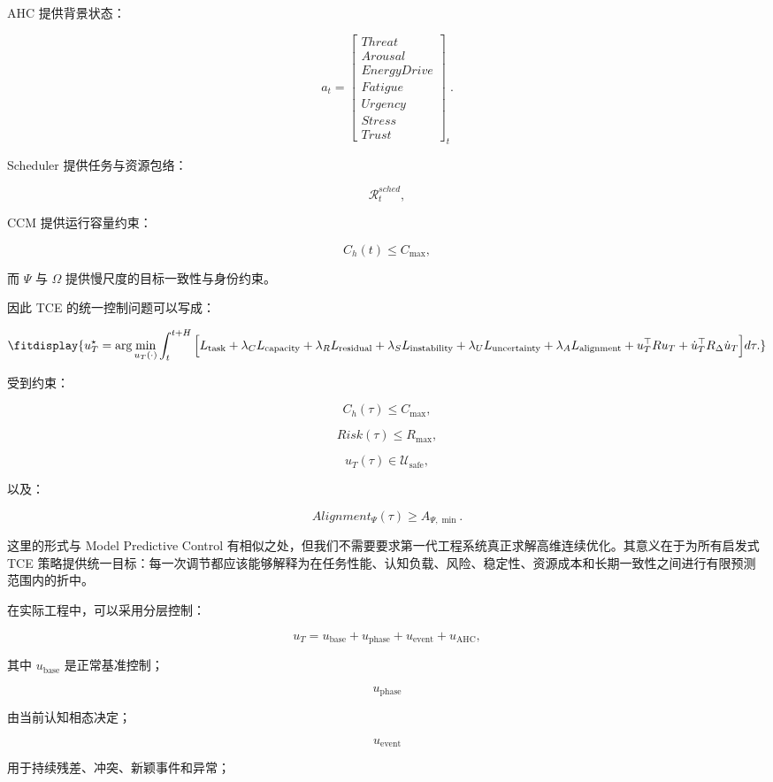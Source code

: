 AHC 提供背景状态：

\[
a_t
=
\begin{bmatrix}
Threat\\
Arousal\\
EnergyDrive\\
Fatigue\\
Urgency\\
Stress\\
Trust
\end{bmatrix}_t.
\]

Scheduler 提供任务与资源包络：

\[
\mathcal R_t^{sched},
\]

CCM 提供运行容量约束：

\[
C_h(t)\le C_{\max},
\]

而 $\Psi$ 与 $\Omega$ 提供慢尺度的目标一致性与身份约束。

因此 TCE 的统一控制问题可以写成：

\[
\fitdisplay{
u_T^\star
=
\arg\min_{u_T(\cdot)}
\int_t^{t+H}
\Big[
L_{\mathrm{task}}
+
\lambda_C L_{\mathrm{capacity}}
+
\lambda_R L_{\mathrm{residual}}
+
\lambda_S L_{\mathrm{instability}}
+
\lambda_U L_{\mathrm{uncertainty}}
+
\lambda_A L_{\mathrm{alignment}}
+
u_T^\top Ru_T
+
\dot u_T^\top R_\Delta\dot u_T
\Big]
d\tau .
}
\]

受到约束：

\[
C_h(\tau)\le C_{\max},
\]

\[
Risk(\tau)\le R_{\max},
\]

\[
u_T(\tau)
\in
\mathcal U_{\mathrm{safe}},
\]

以及：

\[
Alignment_\Psi(\tau)\ge A_{\Psi,\min}.
\]

这里的形式与 Model Predictive Control 有相似之处，但我们不需要要求第一代工程系统真正求解高维连续优化。其意义在于为所有启发式 TCE 策略提供统一目标：每一次调节都应该能够解释为在任务性能、认知负载、风险、稳定性、资源成本和长期一致性之间进行有限预测范围内的折中。

在实际工程中，可以采用分层控制：

\[
u_T
=
u_{\mathrm{base}}
+
u_{\mathrm{phase}}
+
u_{\mathrm{event}}
+
u_{\mathrm{AHC}},
\]

其中 $u_{\mathrm{base}}$ 是正常基准控制；

\[
u_{\mathrm{phase}}
\]

由当前认知相态决定；

\[
u_{\mathrm{event}}
\]

用于持续残差、冲突、新颖事件和异常；

